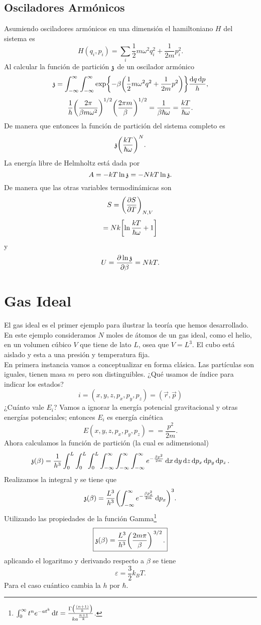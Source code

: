 \section{Osciladores Armónicos}
Asumiendo osciladores armónicos en una dimensión el hamiltoniano $H$ del sistema es
    $$ H(q_i ,p_i) = \sum _i \frac{1}{2} m\omega ^2 q_i ^2 + \frac{1}{2m} p_i ^2 . $$
Al calcular la función de partición $\mathfrak{z}$ de un oscilador armónico 
    $$ \mathfrak{z} = \int _{-\infty} ^\infty \int _{-\infty} ^\infty \exp{-\beta \qty(\frac{1}{2} m\omega ^2 q^2 + \frac{1}{2m} p^2)} \frac{\dd{q} \dd{p}}{h}, $$
    $$ \frac{1}{h} \qty(\frac{2\pi}{\beta m\omega ^2})^{1/2} \qty(\frac{2\pi m}{\beta})^{1/2} = \frac{1}{\beta \hbar \omega} = \frac{kT}{\hbar \omega}. $$
De manera que entonces la función de partición del sistema completo es
    $$ \mathfrak{z} \qty(\frac{kT}{\hbar \omega})^N. $$
La energía libre de Helmholtz está dada por
    $$ A = -kT\ln{\mathfrak{z}} = -NkT \ln{\mathfrak{z}}. $$
De manera que las otras variables termodinámicas son
    $$ S = \qty(\pdv{S}{T})_{N,V} $$
    $$ = Nk\qty[\ln{\frac{kT}{\hbar \omega}} + 1] $$
y
    $$ U = \pdv{\ln{\mathfrak{z}}}{\beta} = NkT. $$
    
    
    
\chapter{Gas Ideal}

El gas ideal es el primer ejemplo para ilustrar la teoría que hemos desarrollado. En este ejemplo consideramos $N$ moles de átomos de un gas ideal, como el helio, en un volumen cúbico $V$ que tiene de lato $L$, osea que $V = L^3$. El cubo está aislado y esta a una presión y temperatura fija. \\
En primera instancia vamos a conceptualizar en forma clásica. Las partículas son iguales, tienen masa $m$ pero son distinguibles. ¿Qué usamos de índice para indicar los estados?
	$$ i = (x,y,z,p_x,p_y,p_z) = (\vec{r},\vec{p}) $$
¿Cuánto vale $E_i$? Vamos a ignorar la energía potencial gravitacional y otras energías potenciales; entonces $E_i$ es energía cinética
	$$ E(x,y,z,p_x,p_y,p_z) = = \frac{p^2}{2m} . $$
Ahora calculamos la función de partición (la cual es adimensional)
	$$ \mathfrak{z} (\beta) =  \frac{1}{h^3} \int _0 ^L \int _0 ^L \int _0 ^L \int _{-\infty} ^\infty \int _{-\infty} ^\infty \int _{-\infty} ^\infty e^{-\frac{\beta p^2}{2m}} \dd{x} \dd{y} \dd{z} \dd{p_x} \dd{p_y} \dd{p_z}. $$
Realizamos la integral y se tiene que
	$$ \mathfrak{z} (\beta) = \frac{L^3}{h^3} \qty(\int _{-\infty} ^\infty e^{-\frac{\beta p_x ^2}{2m}} \dd{p_x})^3. $$
Utilizando las propiedades de la función Gamma\footnote{$\int _0 ^\infty t^n e^{-at^k} \dd{t} = \frac{\Gamma \qty(\frac{(n+1)}{k})}{ka^{\frac{n+1}{k}}}$.}
    $$ \boxed{ \partition (\beta) = \frac{L^3}{h^3} \qty(\frac{2m\pi}{\beta})^{\flatfrac{3}{2}}. } $$
aplicando el logaritmo y derivando respecto a $\beta$ se tiene
    $$ \boxed{\varepsilon = \frac{3}{2} k_B T .} $$
Para el caso cuántico cambia la $h$ por $\hbar$. \\

